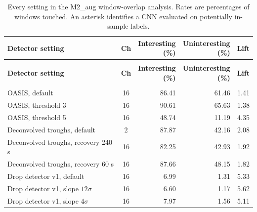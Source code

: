 \begingroup
\small
\setlength{\tabcolsep}{4pt}
\begin{longtable}{@{}>{\raggedright\arraybackslash}p{7.0cm} c r r r@{}}
\caption[{Every setting in the M2\_aug window-overlap analysis.}]{Every setting in the M2\_aug window-overlap analysis. Rates are percentages of windows touched. An asterisk identifies a CNN evaluated on potentially in-sample labels.}
\label{tab:windowtouchfull}\\
\toprule
\textbf{Detector setting} & \textbf{Ch} & \makecell{\textbf{Interesting}\\\textbf{(\%)}} & \makecell{\textbf{Uninteresting}\\\textbf{(\%)}} & \textbf{Lift}\\
\midrule
\endfirsthead
\multicolumn{5}{@{}l}{\tablename~\thetable\ (continued)}\\
\toprule
\textbf{Detector setting} & \textbf{Ch} & \makecell{\textbf{Interesting}\\\textbf{(\%)}} & \makecell{\textbf{Uninteresting}\\\textbf{(\%)}} & \textbf{Lift}\\
\midrule
\endhead
\midrule
\multicolumn{5}{r@{}}{Continued on next page}\\
\endfoot
\bottomrule
\endlastfoot
OASIS, default & 16 & 86.41 & 61.46 & 1.41\\
OASIS, threshold 3 & 16 & 90.61 & 65.63 & 1.38\\
OASIS, threshold 5 & 16 & 48.74 & 11.19 & 4.35\\
\addlinespace
Deconvolved troughs, default & 2 & 87.87 & 42.16 & 2.08\\
Deconvolved troughs, recovery 240 s & 16 & 82.25 & 42.93 & 1.92\\
Deconvolved troughs, recovery 60 s & 16 & 87.66 & 48.15 & 1.82\\
\addlinespace
Drop detector v1, default & 16 & 6.99 & 1.31 & 5.33\\
Drop detector v1, slope $12\sigma$ & 16 & 6.60 & 1.17 & 5.62\\
Drop detector v1, slope $4\sigma$ & 16 & 7.97 & 1.56 & 5.11\\

\end{longtable}
